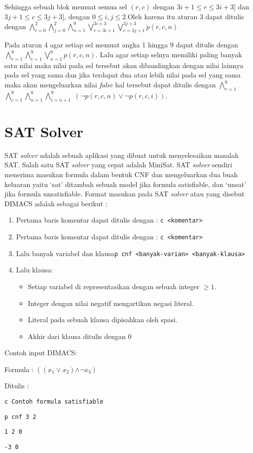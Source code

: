 Sehingga sebuah blok memuat semua sel $\left(r,c\right)$ dengan $3i+1\leq r\leq3i+3]$
dan $3j+1\leq c\leq3j+3]$, dengan $0\leq i,j\leq2$.Oleh karena itu aturan 3 dapat ditulis dengan $\bigwedge_{i=0}^{2}$$\bigwedge_{j=0}^{2}$$\bigwedge_{n=1}^{9}$$\bigvee_{r=3i+1}^{3i+3}$$\bigvee_{c=3j+1}^{3j+3}$$p\left(r,c,n\right)$

Pada aturan 4 agar setiap sel memuat angka 1 hingga 9 dapat ditulis dengan $\bigwedge_{r=1}^{9}$$\bigwedge_{c=1}^{9}$$\bigvee_{n=1}^{9}$$p\left(r,c,n\right)$. Lalu agar setiap selnya memiliki paling banyak satu nilai maka nilai pada sel tersebut akan dibandingkan dengan nilai lainnya pada sel yang sama dan jika terdapat dua atau lebih nilai pada sel yang sama maka akan mengeluarkan nilai \textit{false} hal tersebut  dapat ditulis dengan $\bigwedge_{r=1}^{9}$$\bigwedge_{c=1}^{9}$$\bigwedge_{n=1}^{8}$$\bigwedge_{i=n+1}^{9}$
$\left(\neg p\left(r,c,n\right)\vee\neg p\left(r,c,i\right)\right)$.

\section{SAT Solver}

SAT \textit{solver} adalah sebuah aplikasi yang dibuat untuk menyelesaikan masalah SAT. Salah satu SAT \textit{solver} yang cepat adalah MiniSat. SAT \textit{solver} sendiri menerima masukan formula dalam bentuk CNF dan mengeluarkan dua buah keluaran yaitu `sat' ditambah sebuah model jika formula satisfiable, dan `unsat' jika formula unsatisfiable. Format masukan pada SAT \textit{solver} atau yang disebut DIMACS adalah sebagai berikut :

\begin{enumerate}
	\item Pertama baris komentar dapat ditulis dengan : \texttt{c <komentar>}
	\item Pertama baris komentar dapat ditulis dengan : \texttt{c <komentar>}
	\item Lalu banyak variabel dan klausa\texttt{p cnf <banyak-varian> <banyak-klausa>}
	\item Lalu klausa: 
	
	\begin{itemize}
		\item Setiap variabel di representasikan dengan sebuah integer $\geq1$.
		\item Integer dengan nilai negatif mengartikan negasi literal.
		\item Literal pada sebuah klausa dipisahkan oleh spasi.
		\item Akhir dari klausa ditulis dengan 0
	\end{itemize}
\end{enumerate}
Contoh input DIMACS:

Formula : $\left(\left(\ensuremath{x_{1}}\ensuremath{\vee}\ensuremath{x_{2}}\right)\ensuremath{\wedge\neg}\ensuremath{x_{3}}\right)$

Ditulis : 

\texttt{c Contoh formula satisfiable}

\texttt{p cnf 3 2} 

\texttt{1 2 0}

\texttt{-3 0}
